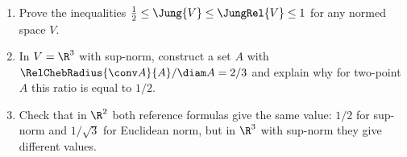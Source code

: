 \documentclass[a4paper,12pt]{report}
\begin{document}
\begin{task}
\begin{enumerate}[label=\textup{(\alph*)}]
\item Prove the inequalities $\frac12 \le \Jung{V} \le \JungRel{V} \le 1$ for any normed space $V$.
\item In $V = \R^3$ with sup-norm, construct a set $A$ with $\RelChebRadius{\conv A}{A}/\diam A = 2/3$ and explain why for two-point $A$ this ratio is equal to $1/2$.
\item Check that in $\R^2$ both reference formulas give the same value\textup{:} $1/2$ for sup-norm and $1/\sqrt3$ for Euclidean norm, but in $\R^3$ with sup-norm they give different values.
\end{enumerate}

\end{task}
\end{document}
